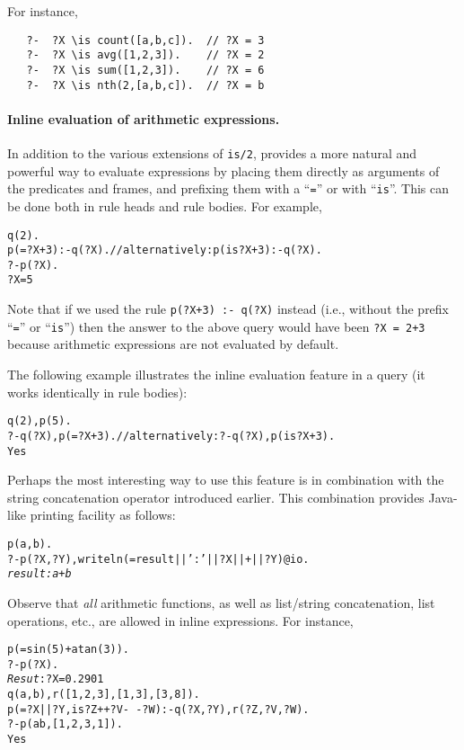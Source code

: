 For instance,
\begin{verbatim}
   ?-  ?X \is count([a,b,c]).  // ?X = 3
   ?-  ?X \is avg([1,2,3]).    // ?X = 2
   ?-  ?X \is sum([1,2,3]).    // ?X = 6
   ?-  ?X \is nth(2,[a,b,c]).  // ?X = b
\end{verbatim}

\paragraph{Inline evaluation of arithmetic expressions.}
In addition to the various extensions of
\texttt{\bs{}is/2}, \ERGO provides a more natural and powerful way to
evaluate expressions by placing them directly as arguments of the
predicates and frames, and prefixing them with a ``\texttt{=}'' or with
``\texttt{\bs{}is}''.
This can be done both in rule heads and rule bodies. For example,
\begin{alltt}
    q(2).\\
    p(=?X+3) :- q(?X).  // alternatively: p(\bs{}is ?X+3) :- q(?X). \\
    ?- p(?X).\\

    ?X = 5
\end{alltt}
Note that if we used the rule \texttt{p(?X+3) :- q(?X)} instead (i.e.,
without the prefix ``\texttt{=}'' or ``\texttt{\bs{}is}'') then the answer
to the above query would have been
\texttt{?X = 2+3} because arithmetic expressions are not evaluated by
default.

The following example illustrates the inline evaluation feature in a query
(it works identically in rule bodies):
\begin{alltt}
   q(2), p(5).\\
   ?- q(?X), p(=?X+3).  //  alternatively: ?- q(?X), p(\bs{}is ?X+3).  \\

   Yes
\end{alltt}
Perhaps the most interesting way to use this feature is in combination with
the string concatenation operator introduced earlier. This combination
provides Java-like printing facility as follows:
\begin{alltt}
   p(a,b).\\
   ?- p(?X,?Y), writeln(= result ||': '|| ?X|| + || ?Y)@\bs{}io.\\
   \textit{result: a+b}   
\end{alltt}
Observe that \emph{all}  
arithmetic functions, as well as list/string
concatenation, list operations, etc., are allowed in inline
expressions. For instance,
\begin{alltt}
   p(=sin(5)+atan(3)).\\
   ?- p(?X).\\
   {\it Resut\/}: ?X = 0.2901\\

   q(a,b), r([1,2,3],[1,3],[3,8]).\\
   p(=?X||?Y, \bs{}is ?Z++?V-\,-?W) :- q(?X,?Y), r(?Z,?V,?W).\\
   ?- p(ab,[1,2,3,1]).\\
   Yes
\end{alltt}

